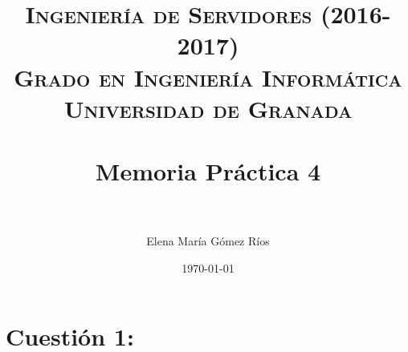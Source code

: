 


\title{	
\normalfont \normalsize 
\textsc{\textbf{Ingeniería de Servidores (2016-2017)} \\ Grado en Ingeniería Informática \\ Universidad de Granada} \\ [25pt] %
\horrule{0.5pt} \\[0.4cm] %
\huge Memoria Práctica 4 \\ %
\horrule{2pt} \\[0.5cm] %
}

\author{Elena María Gómez Ríos} %

\date{\normalsize\today} %




\maketitle %

\newpage %

\tableofcontents %

\listoffigures

\listoftables

\newpage

 


\newpage


\section{Cuestión 1:}


